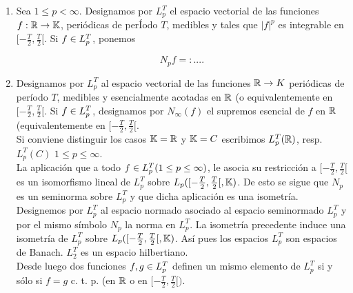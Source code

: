 \begin{enumerate}[1)]
\item Sea $1 \leq p <\infty$. Designamos por $L_p ^T$ el espacio vectorial de las funciones $f:\mathbb{R} \rightarrow \mathbb{K}$, periódicas de perÍodo $T$, medibles y tales que $|f|^p$ es integrable en $[-\frac{T}{2},\frac{T}{2}[$. Si $f \in L_p^T$, ponemos

$$
N_p f=: ....
$$
\item Designamos por $L_p^T$ al espacio vectorial de las funciones $\mathbb{R} \rightarrow K$ periódicas de período $T$, medibles y esencialmente acotadas en $\mathbb{R}$ (o equivalentemente en $[-\frac{T}{2},\frac{T}{2}[$. Si $f \in L_p^T$, designamos por $N_\infty (f)$ el supremos esencial de $f$ en $\mathbb{R}$ (equivalentemente en $[-\frac{T}{2},\frac{T}{2}[$. \\
Si conviene distinguir los casos $\mathbb{K} =\mathbb{R}$ y $\mathbb{K} =C$ escribimos $L_p ^T (\mathbb{R})$, resp. $L_p^T (C)$ $1 \leq p \leq \infty$.\\
La aplicación que a todo $f \in L_p^T (1 \leq p \leq \infty )$, le asocia su restricción a $[-\frac{T}{2},\frac{T}{2}[$ es un isomorfismo lineal de $L_p^T$ sobre $L_p ([-\frac{T}{2},\frac{T}{2}[,\mathbb{K})$. De esto se sigue que $N_p$ es un seminorma sobre $L_p^T$ y que dicha aplicación es una isometría.\\
Designemos por $L_p^T$ al espacio normado asociado al espacio seminormado $L_p^T$ y por el mismo símbolo $N_p$ la norma en $L_p^T$. La isometría precedente induce una isometría de $L_p^T$ sobre $L_p ([-\frac{T}{2},\frac{T}{2}[,\mathbb{K})$. Así pues los espacios $L_p^T$ son espacios de Banach. $L_2^T$ es un espacio hilbertiano. \\
Desde luego dos funciones $f,g \in L_p^T$ definen un mismo elemento de $L_p^T$ si y sólo si $f=g$ c. t. p. (en $\mathbb{R}$ o en $[-\frac{T}{2},\frac{T}{2}[)$.
\end{enumerate}

